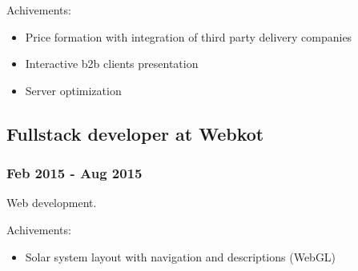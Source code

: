 \documentclass[letterpaper]{article}
\begin{document}
Achivements:
\begin{itemize}
\item Price formation with integration of third party delivery companies
\item Interactive b2b clients presentation
\item Server optimization
\end{itemize}

\subsection{Fullstack developer at Webkot}
\label{sec:org44784ec}
\subsubsection{Feb 2015 - Aug 2015}
\label{sec:orge393de3}
Web development.

Achivements:
\begin{itemize}
\item Solar system layout with navigation and descriptions (WebGL)
\end{itemize}
\end{document}

